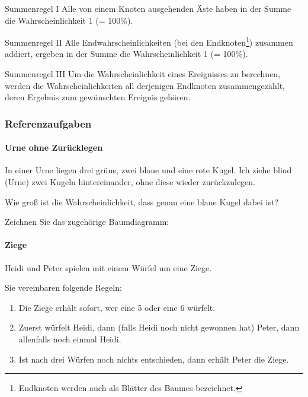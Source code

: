 \begin{gesetz}{Summenregel I}{}
Alle von einem Knoten ausgehenden Äste haben in der Summe die Wahrscheinlichkeit 1 (= 100\%).
\end{gesetz}

\begin{gesetz}{Summenregel II}{}
Alle Endwahrscheinlichkeiten (bei den Endknoten\footnote{Endknoten werden auch als Blätter des Baumes bezeichnet.}) zusammen addiert, ergeben in der Summe die Wahrscheinlichkeit 1 (= 100\%).
\end{gesetz}

\begin{gesetz}{Summenregel III}{}
  Um die Wahrscheinlichkeit eines Ereignisses zu berechnen, werden die
  Wahrscheinlichkeiten all derjenigen Endknoten zusammengezählt, deren Ergebnis zum gewünschten Ereignis gehören.
  \end{gesetz}

\newpage


\subsubsection{Referenzaufgaben}

\paragraph{Urne ohne Zurücklegen} In einer Urne liegen drei grüne, zwei blaue und eine rote Kugel. Ich ziehe blind (Urne) zwei Kugeln hintereinander, ohne diese wieder zurückzulegen.

Wie groß ist die Wahrscheinlichkeit, dass genau eine blaue Kugel dabei ist?

Zeichnen Sie das zugehörige Baumdiagramm:

  
\newpage

\paragraph{Ziege} Heidi und Peter spielen mit einem Würfel um eine Ziege.

Sie vereinbaren folgende Regeln:

\begin{enumerate}
\item Die Ziege erhält sofort, wer eine 5 oder eine 6 würfelt.
\item Zuerst würfelt Heidi, dann (falls Heidi noch nicht gewonnen hat) Peter, dann allenfalls noch einmal Heidi.
\item Ist nach drei Würfen noch nichts entschieden, dann erhält Peter die Ziege.
\end{enumerate}


